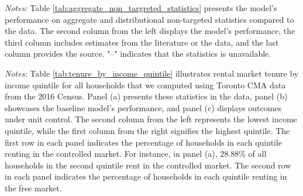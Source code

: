 \documentclass[parskip=full]{article}
\newenvironment{fignote2}[1]
{
\par
\medskip
\begin{minipage}{#1}
\footnotesize
}
{
\end{minipage}
}
\begin{document}
\begin{table}[H]
    \centering
    \caption{Aggregate non-targeted statistics}
    \vspace{-0.5cm}
    \label{tab:aggregate_non_targreted_statistics}  
    \vspace{-0.45cm}
    \begin{fignote2}{0.9\textwidth}
      \textit{Notes:} Table \ref{tab:aggregate_non_targreted_statistics} presents the model's performance on aggregate and distributional non-targeted statistics compared to the data. The second column from the left displays the model's performance, the third column includes estimates from the literature or the data, and the last column provides the source. "--" indicates that the statistics is unavailable.
    \end{fignote2}
\end{table}

\begin{table}[H]
    \centering
    \caption{Rental market choice by income quintile (all households)}
    \vspace{-0.5cm}
    \label{tab:tenure_by_income_quintile}    
    
    \vspace{-0.45cm}
    \begin{fignote2}{0.66\textwidth}
      \textit{Notes:} Table \ref{tab:tenure_by_income_quintile} illustrates rental market tenure by income quintile for all households that we computed using Toronto CMA data from the 2016 Census. Panel (a) presents these statistics in the data, panel (b) showcases the baseline model's performance, and panel (c) displays outcomes under unit control. The second column from the left represents the lowest income quintile, while the first column from the right signifies the highest quintile. The first row in each panel indicates the percentage of households in each quintile renting in the controlled market. For instance, in panel (a), 28.88\% of all households in the second quintile rent in the controlled market. The second row in each panel indicates the percentage of households in each quintile renting in the free market.  
    \end{fignote2}
\end{table}
\end{document}
